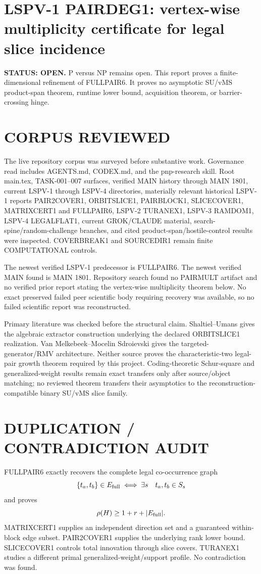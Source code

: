 \documentclass[11pt]{article}
\begin{document}
\section*{LSPV-1 PAIRDEG1: vertex-wise multiplicity certificate for legal slice incidence}
\textbf{STATUS: OPEN.} P versus NP remains open. This report proves a finite-dimensional refinement of FULLPAIR6. It proves no asymptotic SU/vMS product-span theorem, runtime lower bound, acquisition theorem, or barrier-crossing hinge.

\section*{CORPUS REVIEWED}
The live repository corpus was surveyed before substantive work. Governance read includes AGENTS.md, CODEX.md, and the pnp-research skill. Root main.tex, TASK-001--007 surfaces, verified MAIN history through MAIN 1801, current LSPV-1 through LSPV-4 directories, materially relevant historical LSPV-1 reports PAIR2COVER1, ORBITSLICE1, PAIRBLOCK1, SLICECOVER1, MATRIXCERT1 and FULLPAIR6, LSPV-2 TURANEX1, LSPV-3 RAMDOM1, LSPV-4 LEGALFLAT1, current GROK/CLAUDE material, search-spine/random-challenge branches, and cited product-span/hostile-control results were inspected. COVERBREAK1 and SOURCEDIR1 remain finite COMPUTATIONAL controls.

The newest verified LSPV-1 predecessor is FULLPAIR6. The newest verified MAIN found is MAIN 1801. Repository search found no PAIRMULT artifact and no verified prior report stating the vertex-wise multiplicity theorem below. No exact preserved failed peer scientific body requiring recovery was available, so no failed scientific report was reconstructed.

Primary literature was checked before the structural claim. Shaltiel--Umans gives the algebraic extractor construction underlying the declared ORBITSLICE1 realization. Van Melkebeek--Mocelin Sdroievski gives the targeted-generator/RMV architecture. Neither source proves the characteristic-two legal-pair growth theorem required by this project. Coding-theoretic Schur-square and generalized-weight results remain exact transfers only after source/object matching; no reviewed theorem transfers their asymptotics to the reconstruction-compatible binary SU/vMS slice family.

\section*{DUPLICATION / CONTRADICTION AUDIT}
FULLPAIR6 exactly recovers the complete legal co-occurrence graph
\[
\{t_a,t_b\}\in E_{\rm full}
\iff
\exists s\quad t_a,t_b\in S_s
\]
and proves
\[
\rho(H)\ge 1+r+|E_{\rm full}|.
\]
MATRIXCERT1 supplies an independent direction set and a guaranteed within-block edge subset. PAIR2COVER1 supplies the underlying rank lower bound. SLICECOVER1 controls total innovation through slice covers. TURANEX1 studies a different primal generalized-weight/support profile. No contradiction was found.
\end{document}
